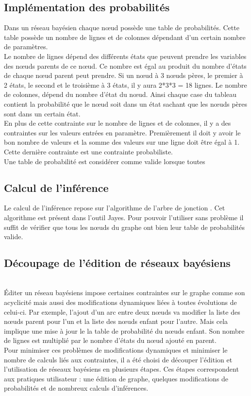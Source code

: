 \documentclass[conference]{IEEEtran}
\begin{document}
\subsection{Implémentation des probabilités}
Dans un réseau bayésien chaque nœud possède une table de probabilités. Cette table possède un nombre de lignes et de colonnes dépendant d'un certain nombre de paramètres. \\
Le nombre de lignes dépend des différents états que peuvent prendre les variables des nœuds parents de ce nœud. Ce nombre est égal au produit du nombre d'états de chaque nœud parent peut prendre. Si un nœud à 3 nœuds pères, le premier à 2 états, le second et le troisième à 3 états, il y aura 2*3*3 = 18 lignes. Le nombre de colonnes, dépend du nombre d'état du nœud. Ainsi chaque case du tableau contient la probabilité que le nœud soit dans un état sachant que les nœuds pères sont dans un certain état.\\
En plus de cette contrainte sur le nombre de lignes et de colonnes, il y a des contraintes sur les valeurs entrées en paramètre. Premièrement il doit y avoir le bon nombre de valeurs et la somme des valeurs sur une ligne doit être égal à 1. Cette dernière contrainte est une contrainte probabiliste. \\  
Une table de probabilité est considérer comme valide lorsque toutes  

\subsection{Calcul de l'inférence}
Le calcul de l'inférence repose sur l'algorithme de l'arbre de jonction \cite{reseau}. Cet algorithme est présent dans l'outil Jayes. Pour pouvoir l'utiliser sans problème il suffit de vérifier que tous les nœuds du graphe ont bien leur table de probabilités valide. 

\subsection{Découpage de l'édition de réseaux bayésiens \hfill}
\\
Éditer un réseau bayésiens impose certaines contraintes sur le graphe comme son acyclicité mais aussi des modifications dynamiques liées à toutes évolutions de celui-ci. Par exemple, l'ajout d'un arc entre deux nœuds va modifier la liste des nœuds parent pour l'un et la liste des nœuds enfant pour l'autre. Mais cela implique une mise à jour le la table de probabilité du nœuds enfant. Son nombre de lignes est multiplié par le nombre d'états du nœud ajouté en parent. \\
Pour minimiser ces problèmes de modifications dynamiques et minimiser le nombre de calculs liés aux contraintes, il a été choisi de découper l'édition et l'utilisation de réseaux bayésiens en plusieurs étapes. Ces étapes correspondent aux pratiques utilisateur  : une édition de graphe, quelques modifications de probabilités et de nombreux calculs d'inférences. \\
\end{document}
